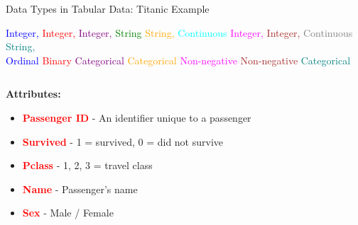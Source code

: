 \documentclass[8pt,aspectratio=1610]{beamer}
\begin{document}
\begin{frame}{Data Types in Tabular Data: Titanic Example}
\vspace{0.2cm}
\begin{center}
\scriptsize
\textcolor{blue}{Integer,} \hspace{0.5cm} \textcolor{red}{Integer,} \hspace{0.5cm} \textcolor{purple}{Integer,} \hspace{1.5cm} \textcolor{green}{String} \hspace{0.5cm} \textcolor{orange}{String,} \hspace{0.5cm} \textcolor{cyan}{Continuous} \hspace{0.2cm} \textcolor{magenta}{Integer,} \hspace{0.2cm} \textcolor{brown}{Integer,} \hspace{0.2cm} \textcolor{gray}{Continuous} \hspace{0.2cm} \textcolor{teal}{String,} \\
\textcolor{blue}{Ordinal} \hspace{0.7cm} \textcolor{red}{Binary} \hspace{0.7cm} \textcolor{purple}{Categorical} \hspace{0.5cm} \hspace{1.5cm} \textcolor{orange}{Categorical} \hspace{1.2cm} \textcolor{magenta}{Non-negative} \hspace{0.2cm} \textcolor{brown}{Non-negative} \hspace{1.0cm} \textcolor{teal}{Categorical}
\end{center}

\vspace{1.0cm}
\begin{columns}
\begin{column}{0.48\textwidth}
\textbf{Attributes:}
\begin{itemize}
\setlength{\itemsep}{2pt}
\item \textcolor{red}{\textbf{Passenger ID}} - An identifier unique to a passenger
\item \textcolor{red}{\textbf{Survived}} - 1 = survived, 0 = did not survive
\item \textcolor{red}{\textbf{Pclass}} - 1, 2, 3 = travel class
\item \textcolor{red}{\textbf{Name}} - Passenger's name
\item \textcolor{red}{\textbf{Sex}} - Male / Female
\end{itemize}
\end{column}


\end{columns}
\end{frame}
\end{document}
